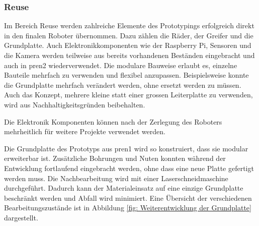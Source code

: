 \subsubsection{Reuse}

Im Bereich Reuse werden zahlreiche Elemente des Prototypings erfolgreich direkt in den finalen Roboter übernommen. Dazu zählen die Räder, der Greifer und die Grundplatte. Auch Elektronikkomponenten wie der Raspberry Pi, Sensoren und die Kamera werden teilweise aus bereits vorhandenen Beständen eingebracht und auch in \acrshort{pren2} wiederverwendet. Die modulare Bauweise erlaubt es, einzelne Bauteile mehrfach zu verwenden und flexibel anzupassen. Beispielsweise konnte die Grundplatte mehrfach verändert werden, ohne ersetzt werden zu müssen. Auch das Konzept, mehrere kleine statt einer grossen Leiterplatte zu verwenden, wird aus Nachhaltigkeitsgründen beibehalten.

Die Elektronik Komponenten können nach der Zerlegung des Roboters mehrheitlich für weitere Projekte verwendet werden.

Die Grundplatte des Prototyps aus \acrshort{pren1} wird so konstruiert, dass sie modular erweiterbar ist. Zusätzliche Bohrungen und Nuten konnten während der Entwicklung fortlaufend eingebracht werden, ohne dass eine neue Platte gefertigt werden muss. Die Nachbearbeitung wird mit einer Laserschneidmaschine durchgeführt. Dadurch kann der Materialeinsatz auf eine einzige Grundplatte beschränkt werden und Abfall wird minimiert. Eine Übersicht der verschiedenen Bearbeitungszustände ist in Abbildung \ref{fig: Weiterentwicklung der Grundplatte} dargestellt.

